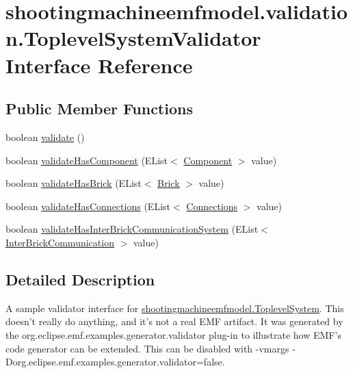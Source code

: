 \hypertarget{interfaceshootingmachineemfmodel_1_1validation_1_1_toplevel_system_validator}{\section{shootingmachineemfmodel.\-validation.\-Toplevel\-System\-Validator Interface Reference}
\label{interfaceshootingmachineemfmodel_1_1validation_1_1_toplevel_system_validator}
}
\subsection*{Public Member Functions}
\begin{DoxyCompactItemize}
\item 
boolean \hyperlink{interfaceshootingmachineemfmodel_1_1validation_1_1_toplevel_system_validator_a445be6a9d953f331e450fb58a72b9af7}{validate} ()
\item 
boolean \hyperlink{interfaceshootingmachineemfmodel_1_1validation_1_1_toplevel_system_validator_a6052d4688130f6b6c8e340889a1be720}{validate\-Has\-Component} (E\-List$<$ \hyperlink{interfaceshootingmachineemfmodel_1_1_component}{Component} $>$ value)
\item 
boolean \hyperlink{interfaceshootingmachineemfmodel_1_1validation_1_1_toplevel_system_validator_a23b03fa0bcb8c8ed384010719917b312}{validate\-Has\-Brick} (E\-List$<$ \hyperlink{interfaceshootingmachineemfmodel_1_1_brick}{Brick} $>$ value)
\item 
boolean \hyperlink{interfaceshootingmachineemfmodel_1_1validation_1_1_toplevel_system_validator_aa548b9d408b09b9be1a24405d2203d11}{validate\-Has\-Connections} (E\-List$<$ \hyperlink{interfaceshootingmachineemfmodel_1_1_connections}{Connections} $>$ value)
\item 
boolean \hyperlink{interfaceshootingmachineemfmodel_1_1validation_1_1_toplevel_system_validator_aa08884420454caa1816b8e434a2827da}{validate\-Has\-Inter\-Brick\-Communication\-System} (E\-List$<$ \hyperlink{interfaceshootingmachineemfmodel_1_1_inter_brick_communication}{Inter\-Brick\-Communication} $>$ value)
\end{DoxyCompactItemize}


\subsection{Detailed Description}
A sample validator interface for \hyperlink{interfaceshootingmachineemfmodel_1_1_toplevel_system}{shootingmachineemfmodel.\-Toplevel\-System}. This doesn't really do anything, and it's not a real E\-M\-F artifact. It was generated by the org.\-eclipse.\-emf.\-examples.\-generator.\-validator plug-\/in to illustrate how E\-M\-F's code generator can be extended. This can be disabled with -\/vmargs -\/\-Dorg.\-eclipse.\-emf.\-examples.\-generator.\-validator=false. 


